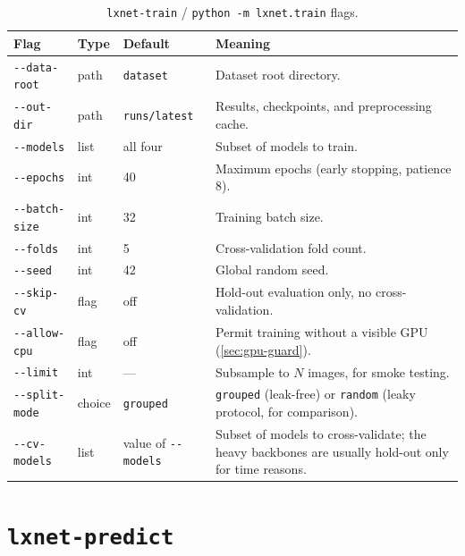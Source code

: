\documentclass[11pt,a4paper,oneside]{report}
\newcommand{\code}[1]{\texttt{\small #1}}
\begin{document}
\begin{table}[h]
\centering
\small
\begin{tabularx}{\linewidth}{@{}lll X@{}}
\toprule
\textbf{Flag} & \textbf{Type} & \textbf{Default} & \textbf{Meaning} \\
\midrule
\code{-{}-data-root} & path & \code{dataset} & Dataset root directory. \\
\code{-{}-out-dir} & path & \code{runs/latest} & Results, checkpoints, and
  preprocessing cache. \\
\code{-{}-models} & list & all four & Subset of models to train. \\
\code{-{}-epochs} & int & 40 & Maximum epochs (early stopping, patience 8). \\
\code{-{}-batch-size} & int & 32 & Training batch size. \\
\code{-{}-folds} & int & 5 & Cross-validation fold count. \\
\code{-{}-seed} & int & 42 & Global random seed. \\
\code{-{}-skip-cv} & flag & off & Hold-out evaluation only, no
  cross-validation. \\
\code{-{}-allow-cpu} & flag & off & Permit training without a visible GPU
  (\cref{sec:gpu-guard}). \\
\code{-{}-limit} & int & --- & Subsample to $N$ images, for smoke testing. \\
\code{-{}-split-mode} & choice & \code{grouped} & \code{grouped} (leak-free)
  or \code{random} (leaky protocol, for comparison). \\
\code{-{}-cv-models} & list & value of \code{-{}-models} & Subset of models
  to cross-validate; the heavy backbones are usually hold-out only for time
  reasons. \\
\bottomrule
\end{tabularx}
\caption{\texttt{lxnet-train} / \texttt{python -m lxnet.train} flags.}
\label{tab:cli-train}
\end{table}

\section{\code{lxnet-predict}}
\end{document}
